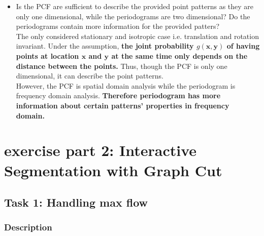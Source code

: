 \documentclass[paper=a4, fontsize=11pt]{scrartcl} %
\numberwithin{equation}{section} %
\numberwithin{figure}{section} %
\numberwithin{table}{section} %
\renewcommand{\vec}[1]{\mathbf{#1}}
\begin{document}
\begin{itemize}
	\pagebreak
	
	\item Is the PCF are sufficient to describe the provided point patterns as they are only one dimensional, while the periodograms are two dimensional? Do the periodograms contain more information for the provided patters? \\
	
	The \cite{oztireli2012analysis} only considered stationary and isotropic case i.e. translation and rotation invariant. Under the assumption, \textbf{the joint probability $g(\vec{x}, \vec{y})$ of having points at location $\vec{x}$ and $\vec{y}$ at the same time only depends on the distance between the points.} Thus, though the PCF is only one dimensional, it can describe the point patterns. \\
	
	However, the PCF is spatial domain analysis while the periodogram is frequency domain analysis. \textbf{Therefore periodogram has more information about certain patterns' properties in frequency domain.}
	
\end{itemize}

\pagebreak


\section{exercise part 2: Interactive Segmentation with Graph Cut}


\subsection{Task 1: Handling max flow}

\subsubsection{Description}
\end{document}

